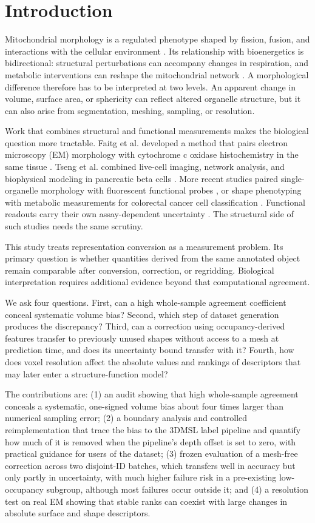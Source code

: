 \documentclass[journal]{IEEEtran}
\begin{document}
\section{Introduction}

Mitochondrial morphology is a regulated phenotype shaped by fission, fusion, and interactions with the cellular environment \cite{ref1}. Its relationship with bioenergetics is bidirectional: structural perturbations can accompany changes in respiration, and metabolic interventions can reshape the mitochondrial network \cite{ref2}. A morphological difference therefore has to be interpreted at two levels. An apparent change in volume, surface area, or sphericity can reflect altered organelle structure, but it can also arise from segmentation, meshing, sampling, or resolution.

Work that combines structural and functional measurements makes the biological question more tractable. Faitg et al. developed a method that pairs electron microscopy (EM) morphology with cytochrome c oxidase histochemistry in the same tissue \cite{ref3}. Tseng et al. combined live-cell imaging, network analysis, and biophysical modeling in pancreatic beta cells \cite{ref4}. More recent studies paired single-organelle morphology with fluorescent functional probes \cite{ref5}, or shape phenotyping with metabolic measurements for colorectal cancer cell classification \cite{ref6}. Functional readouts carry their own assay-dependent uncertainty \cite{ref7}. The structural side of such studies needs the same scrutiny.

This study treats representation conversion as a measurement problem. Its primary question is whether quantities derived from the same annotated object remain comparable after conversion, correction, or regridding. Biological interpretation requires additional evidence beyond that computational agreement.

We ask four questions. First, can a high whole-sample agreement coefficient conceal systematic volume bias? Second, which step of dataset generation produces the discrepancy? Third, can a correction using occupancy-derived features transfer to previously unused shapes without access to a mesh at prediction time, and does its uncertainty bound transfer with it? Fourth, how does voxel resolution affect the absolute values and rankings of descriptors that may later enter a structure-function model?

The contributions are: (1) an audit showing that high whole-sample agreement conceals a systematic, one-signed volume bias about four times larger than numerical sampling error; (2) a boundary analysis and controlled reimplementation that trace the bias to the 3DMSL label pipeline and quantify how much of it is removed when the pipeline's depth offset is set to zero, with practical guidance for users of the dataset; (3) frozen evaluation of a mesh-free correction across two disjoint-ID batches, which transfers well in accuracy but only partly in uncertainty, with much higher failure risk in a pre-existing low-occupancy subgroup, although most failures occur outside it; and (4) a resolution test on real EM showing that stable ranks can coexist with large changes in absolute surface and shape descriptors.
\end{document}
